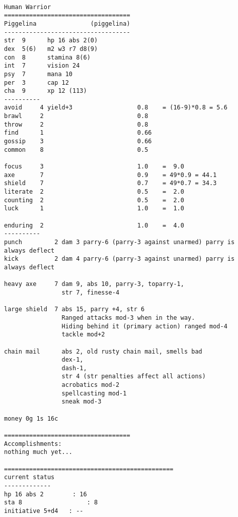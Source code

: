 \


\goodbreak
\tiny \begin{samepage} \begin{verbatim}
Human Warrior
===================================
Piggelina               (piggelina)
-----------------------------------
str  9      hp 16 abs 2(0)
dex  5(6)   m2 w3 r7 d8(9)
con  8      stamina 8(6)
int  7      vision 24
psy  7      mana 10
per  3      cap 12
cha  9      xp 12 (113)
----------
avoid     4 yield+3                  0.8    = (16-9)*0.8 = 5.6
brawl     2                          0.8
throw     2                          0.8
find      1                          0.66
gossip    3                          0.66
common    8                          0.5

focus     3                          1.0    =  9.0
axe       7                          0.9    = 49*0.9 = 44.1
shield    7                          0.7    = 49*0.7 = 34.3
literate  2                          0.5    =  2.0
counting  2                          0.5    =  2.0
luck      1                          1.0    =  1.0

enduring  2                          1.0    =  4.0
----------
punch         2 dam 3 parry-6 (parry-3 against unarmed) parry is always deflect
kick          2 dam 4 parry-6 (parry-3 against unarmed) parry is always deflect

heavy axe     7 dam 9, abs 10, parry-3, toparry-1,
                str 7, finesse-4

large shield  7 abs 15, parry +4, str 6
                Ranged attacks mod-3 when in the way.
                Hiding behind it (primary action) ranged mod-4
                tackle mod+2

chain mail      abs 2, old rusty chain mail, smells bad
                dex-1,
                dash-1,
                str 4 (str penalties affect all actions)
                acrobatics mod-2
                spellcasting mod-1
                sneak mod-3

money 0g 1s 16c

===================================
Accomplishments:
nothing much yet...

===============================================
current status
-------------
hp 16 abs 2        : 16
sta 8                  : 8
initiative 5+d4   : --
\end{verbatim} \end{samepage} \normalsize


\

